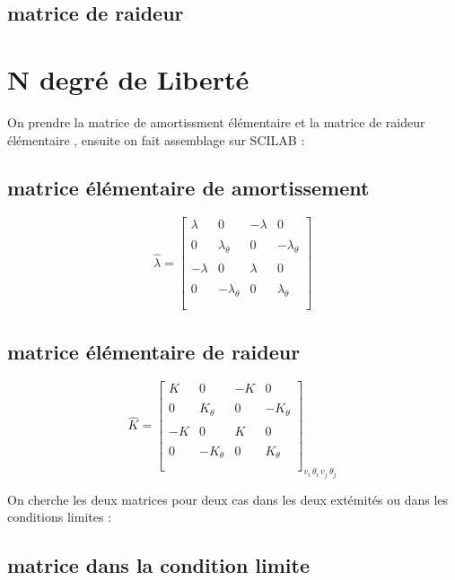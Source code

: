 \documentclass[a4paper,10pt]{report} %
\begin{document}
\subsection{matrice de raideur}



\section{N degré de Liberté}
On prendre la matrice  de amortissment élémentaire  et la matrice de raideur élémentaire , ensuite on fait assemblage sur SCILAB :
\subsection{matrice élémentaire de amortissement}
\[ \widehat{\lambda}=\left[ \begin{array}{cccc}
\lambda &0& -\lambda&0     \\\\
0& \lambda_{\theta}&0&-\lambda_{\theta} \\\\
-\lambda &0& \lambda&0    \\\\
0&-\lambda_{\theta}&0&\lambda_{\theta}    \\\\
 \end{array} \right]_{}\]

\subsection{matrice élémentaire de raideur}
\[ \widehat{K}=\left[ \begin{array}{cccc}
K &0& -K&0     \\\\
0 & K_{\theta}&0&-K_{\theta} \\\\
-K &0& K&0     \\\\
0&-K_{\theta}& 0&K_{\theta}   \\\\
 \end{array} \right]_{v_i \, \theta_i \, v_j \, \theta_j \, } \]

On cherche les deux matrices pour deux cas dans les deux extémités ou dans les conditions limites :

\subsection{matrice dans la condition limite}
\end{document}
